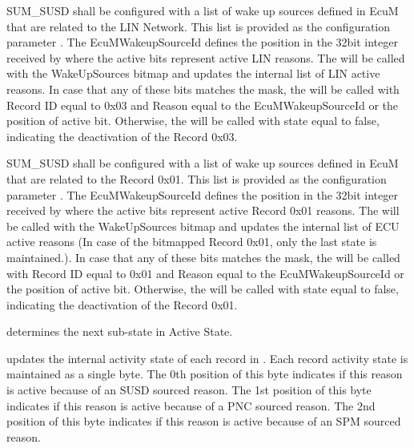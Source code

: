 {
SUM_SUSD shall be configured with a list of wake up sources defined in EcuM that are related to the LIN Network. This list is provided as the configuration parameter .
The EcuMWakeupSourceId defines the position in the 32bit integer received by  where the active bits represent active LIN reasons.
The  will be called with the WakeUpSources bitmap and updates the internal list of LIN active reasons.
In case that any of these bits matches the mask, the  will be called with Record ID equal to 0x03 and Reason equal to the EcuMWakeupSourceId or the position of active bit.
Otherwise, the  will be called with state equal to false, indicating the deactivation of the Record 0x03.
}
{}

{
SUM_SUSD shall be configured with a list of wake up sources defined in EcuM that are related to the Record 0x01. This list is provided as the configuration parameter .
The EcuMWakeupSourceId defines the position in the 32bit integer received by  where the active bits represent active Record 0x01 reasons.
The  will be called with the WakeUpSources bitmap and updates the internal list of ECU active reasons (In case of the bitmapped Record 0x01, only the last state is maintained.).
In case that any of these bits matches the mask, the  will be called with Record ID equal to 0x01 and Reason equal to the EcuMWakeupSourceId or the position of active bit.
Otherwise, the  will be called with state equal to false, indicating the deactivation of the Record 0x01.
}
{}

{ determines the next sub-state in Active State.}
{}

{ updates the internal activity state of each record in . Each record activity state is maintained as a single byte.
The 0th position of this byte indicates if this reason is active because of an SUSD sourced reason.
The 1st position of this byte indicates if this reason is active because of a PNC sourced reason.
The 2nd position of this byte indicates if this reason is active because of an SPM sourced reason.
}
{}


